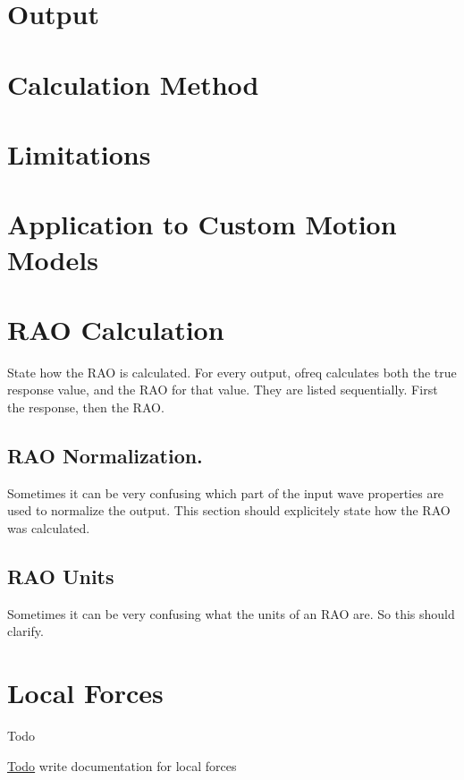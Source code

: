 \section*{Output}

\section*{Calculation Method}

\section*{Limitations}

\section*{Application to Custom Motion Models}

\section*{R\-A\-O Calculation}

State how the R\-A\-O is calculated. For every output, ofreq calculates both the true response value, and the R\-A\-O for that value. They are listed sequentially. First the response, then the R\-A\-O.

\subsection*{R\-A\-O Normalization.}

Sometimes it can be very confusing which part of the input wave properties are used to normalize the output. This section should explicitely state how the R\-A\-O was calculated.

\subsection*{R\-A\-O Units}

Sometimes it can be very confusing what the units of an R\-A\-O are. So this should clarify. \hypertarget{local_force}{}\section{Local Forces}\label{local_force}
\begin{DoxyRefDesc}{Todo}
\item[\hyperlink{todo__todo000019}{Todo}]write documentation for local forces\end{DoxyRefDesc}


